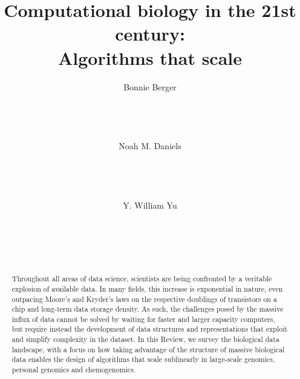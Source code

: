 \documentclass{acm_proc_article-sp}
\begin{document}
\title{Computational biology in the 21st century:\\Algorithms that scale}

\author{
\alignauthor
Bonnie Berger\\
       \\
       \\
       \\
       \\
\alignauthor
Noah M. Daniels\\
       \\
       \\
       \\
       \\
\alignauthor
Y. William Yu\\
       \\
       \\
       \\
       \\
}

\maketitle
\begin{abstract}
Throughout all areas of data science, scientists are being confronted by a
veritable explosion of available data. In many fields, this increase is
exponential in nature, even outpacing Moore's and Kryder's laws on the
respective doublings of transistors on a chip and long-term data storage
density. As such, the challenges posed by the massive influx of data cannot
be solved by waiting for faster and larger capacity computers, but require
instead the development of data structures and representations that exploit
and simplify complexity in the dataset. In this Review, we
survey the biological data landscape, with a focus on how taking advantage
of the structure of massive biological data enables the design of algorithms
that scale sublinearly in large-scale genomics, personal genomics and
chemogenomics.
\end{abstract}
\end{document}
